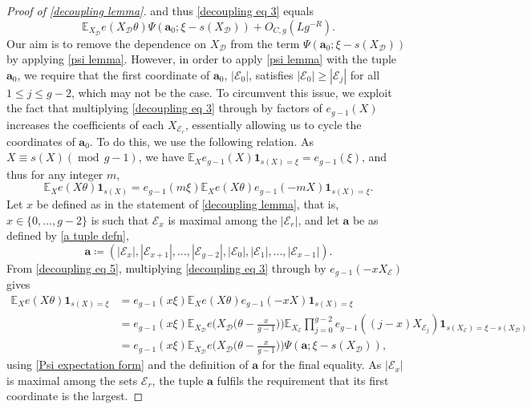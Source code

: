 \documentclass[hidelinks,11pt,reqno]{amsart}
\renewcommand{\leq}{\leqslant}
\renewcommand{\geq}{\geqslant}
\newcommand{\E}{\ensuremath{\mathbb{E}}}
\newcommand{\ind}{\mathbf{1}}
\newcommand{\xb}{X}
\newcommand{\xbd}{X_{\mathcal{D}}}
\newcommand{\xbee}{X_{\mathcal{E}}}
\newcommand{\ru}[1]{e_{g-1}(#1)}
\newcommand{\sx}[1]{s(#1)}
\theoremstyle{remark}
\newcommand{\md}[1]{\ensuremath{(\operatorname{mod}\, #1)}}
\begin{document}
\begin{proof}[Proof of \cref{decoupling lemma}]
and thus \cref{decoupling eq 3} equals
\[\E_{\xbd}e(\xbd\theta) \Psi(\mathbf{a}_{0};\xi-\sx{\xbd})+O_{C,g}(L g^{-R}).\]
Our aim is to remove the dependence on $\xbd$ from the term $ \Psi(\mathbf{a}_{0};\xi-\sx{\xbd})$ by applying \cref{psi lemma}. However, in order to apply \cref{psi lemma} with the tuple $\mathbf{a}_{0}$, we require that the first coordinate of $\mathbf{a}_{0}$, $|\mathcal{E}_{0}|$, satisfies $|\mathcal{E}_{0}|\geq |\mathcal{E}_{j}|$ for all $1\leq j \leq g-2$, which may not be the case. To circumvent this issue, we exploit the fact that multiplying \cref{decoupling eq 3} through by factors of $\ru{X}$ increases the coefficients of each $X_{\mathcal{E}_{r}}$, essentially allowing us to cycle the coordinates of $\mathbf{a}_{0}$. To do this, we use the following relation. As $\xb\equiv \sx{\xb} \md{g-1}$, we have $\E_{X}\ru{\xb}\ind_{\sx{\xb}=\xi}=\ru{\xi}$, and thus for any integer $m$,
 \begin{equation}\label{decoupling eq 5}
     \E_{\xb}e(\xb\theta)\ind_{\sx{\xb}}=\ru{m\xi}\E_{\xb}e(\xb\theta)\ru{-m\xb }\ind_{\sx{\xb}=\xi}.
 \end{equation}
Let $x$ be defined as in the statement of \cref{decoupling lemma}, that is, $x\in\{0,\ldots, g-2\}$ is such that $\mathcal{E}_{x}$ is maximal among the $|\mathcal{E}_{r}|$, and let $\mathbf{a}$ be as defined by \cref{a tuple defn},
\[  \mathbf{a}\coloneq(|\mathcal{E}_{x}|,|\mathcal{E}_{x+1}|,\ldots, |\mathcal{E}_{g-2}|,|\mathcal{E}_{0}|,|\mathcal{E}_{1}|,\ldots, |\mathcal{E}_{x-1}|).\]
From \cref{decoupling eq 5}, multiplying \cref{decoupling eq 3} through by $\ru{-x\xbee}$ gives
\begin{align}
    \E_{\xb}e(X\theta)\ind_{s(X)=\xi}&=\ru{x\xi}\E_{X}e(X\theta)\ru{-xX}\ind_{s(X)=\xi}\nonumber\\
    &=\ru{x\xi}\E_{\xbd}e\Big (\xbd\Big (\theta-\frac{x}{g-1}\Big )\Big )\E_{\xbee}\prod_{j=0}^{g-2}\ru{(j-x)\xb_{\mathcal{E}_{j}}}\ind_{\sx{\xbee}=\xi-\sx{\xbd}}\nonumber\\
    &=\ru{x\xi}\E_{\xbd}e\Big (\xbd\Big (\theta-\frac{x}{g-1}\Big )\Big )\Psi(\mathbf{a};\xi-\sx{\xbd}),\label{decoupling eq 4}
\end{align}
using \cref{Psi expectation form} and the definition of $\mathbf{a}$ for the final equality. As $|\mathcal{E}_{x}|$ is maximal among the sets $\mathcal{E}_{r}$, the tuple $\mathbf{a}$ fulfils the requirement that its first coordinate is the largest.
 

\end{proof}
\end{document}
